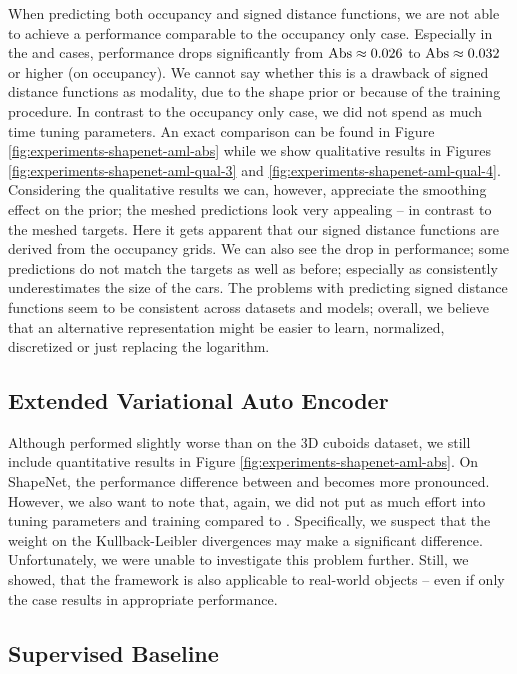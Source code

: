 When predicting both occupancy and signed distance functions, we are not able
to achieve a performance comparable to the occupancy only case. Especially
in the \moderate and \hard cases, performance drops significantly from
$\text{Abs} \approx 0.026$ to $\text{Abs} \approx 0.032$ or higher (on occupancy).
We cannot say whether this is a drawback of
signed distance functions as modality, due to the shape prior or because of
the training procedure. In contrast to the occupancy only case, we did not
spend as much time tuning parameters. An exact comparison can be found in 
Figure \ref{fig:experiments-shapenet-aml-abs} while we show qualitative
results in Figures \ref{fig:experiments-shapenet-aml-qual-3}
and \ref{fig:experiments-shapenet-aml-qual-4}.
Considering the qualitative results we can, however, appreciate the
smoothing effect on the prior; the meshed predictions look very appealing -- 
in contrast to the meshed targets. Here it gets apparent that our signed
distance functions are derived from the occupancy grids. We can also
see the drop in performance; some predictions do not match the targets as
well as before; especially as \AML consistently underestimates the size
of the cars. The problems with predicting signed distance functions seem
to be consistent across datasets and models; overall, we believe that
an alternative representation might be easier to learn, \eg normalized,
discretized or just replacing the logarithm.

\subsection{Extended Variational Auto Encoder}

Although \EVAE performed slightly worse than \AML on the 3D cuboids dataset,
we still include quantitative results in Figure \ref{fig:experiments-shapenet-aml-abs}.
On ShapeNet, the performance difference between \AML and \EVAE becomes more pronounced.
However, we also want to note that, again, we did not put as much effort into
tuning parameters and training compared to \AML. Specifically, we suspect that
the weight on the Kullback-Leibler divergences may make a significant
difference. Unfortunately, we were unable to investigate this problem
further. Still, we showed, that the framework is also applicable to
real-world objects -- even if only the \easy case results in appropriate performance.

\subsection{Supervised Baseline}
\label{sec:experiments-shapenet-supervised-baseline}


